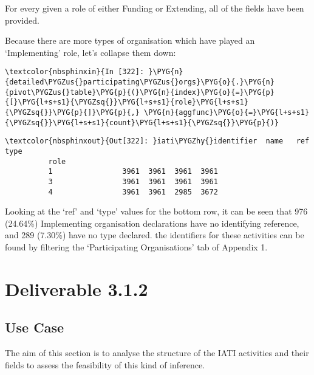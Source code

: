 \documentclass[letterpaper,10pt,english]{sphinxmanual}
\begin{document}
For every  given a role of either Funding or
Extending, all of the fields have been provided.

Because there are more types of organisation which have played an
`Implementing' role, let's collapse them down:

\begin{Verbatim}[commandchars=\\\{\}]
\textcolor{nbsphinxin}{In [322]: }\PYG{n}{detailed\PYGZus{}participating\PYGZus{}orgs}\PYG{o}{.}\PYG{n}{pivot\PYGZus{}table}\PYG{p}{(}\PYG{n}{index}\PYG{o}{=}\PYG{p}{[}\PYG{l+s+s1}{\PYGZsq{}}\PYG{l+s+s1}{role}\PYG{l+s+s1}{\PYGZsq{}}\PYG{p}{]}\PYG{p}{,} \PYG{n}{aggfunc}\PYG{o}{=}\PYG{l+s+s1}{\PYGZsq{}}\PYG{l+s+s1}{count}\PYG{l+s+s1}{\PYGZsq{}}\PYG{p}{)}
\end{Verbatim}

\begin{Verbatim}[commandchars=\\\{\}]
\textcolor{nbsphinxout}{Out[322]: }iati\PYGZhy{}identifier  name   ref  type
          role
          1                3961  3961  3961  3961
          3                3961  3961  3961  3961
          4                3961  3961  2985  3672
\end{Verbatim}

Looking at the `ref' and `type' values for the bottom row, it can be
seen that 976 (24.64\%) Implementing organisation declarations have no
identifying reference, and 289 (7.30\%) have no type declared. the
identifiers for these activities can be found by filtering the
`Participating Organisations' tab of Appendix 1.


\section{Deliverable 3.1.2}
\label{\detokenize{Global Affairs Canada - Compliance Report:Deliverable-3.1.2}}

\subsection{Use Case}
\label{\detokenize{Global Affairs Canada - Compliance Report:Use-Case}}

The aim of this section is to analyse the structure of the IATI
activities and their fields to assess the feasibility of this kind of
inference.
\end{document}
